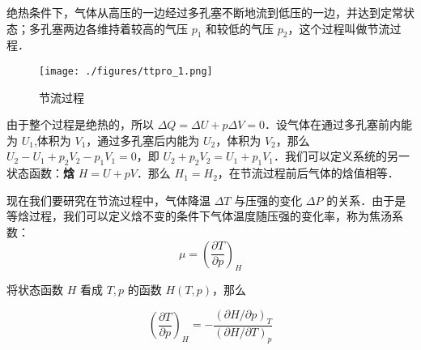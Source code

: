 

绝热条件下，气体从高压的一边经过多孔塞不断地流到低压的一边，并达到定常状态；多孔塞两边各维持着较高的气压 $p_1$ 和较低的气压 $p_2$，这个过程叫做节流过程．

\begin{figure}[ht]
\centering
\texttt{[image: ./figures/ttpro\_1.png]}
\caption{节流过程} \label{ttpro_fig1}
\end{figure}

由于整个过程是绝热的，所以 $\Delta Q=\Delta U+p\Delta V=0$．设气体在通过多孔塞前内能为 $U_1$,体积为 $V_1$，通过多孔塞后内能为 $U_2$，体积为 $V_2$，那么 $U_2-U_1+p_2V_2-p_1V_1=0$，即 $U_2+p_2V_2=U_1+p_1V_1$．我们可以定义系统的另一状态函数：\textbf{焓} $H=U+pV$．那么 $H_1=H_2$，在节流过程前后气体的焓值相等．

现在我们要研究在节流过程中，气体降温 $\Delta T$ 与压强的变化 $\Delta P$ 的关系．由于是等焓过程，我们可以定义焓不变的条件下气体温度随压强的变化率，称为焦汤系数：
\begin{equation}
\mu=\left(\frac{\partial T}{\partial p}\right)_H
\end{equation}

将状态函数 $H$ 看成 $T,p$ 的函数 $H(T,p)$，那么

\begin{equation}
\left(\frac{\partial T}{\partial p}\right)_H=
-\frac{(\partial H/\partial p)_T}{(\partial H/\partial T)_p}
\end{equation}